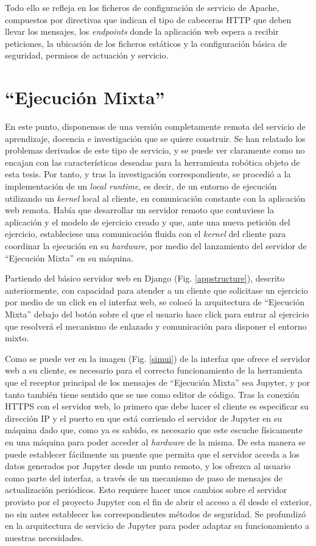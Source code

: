 Todo ello se refleja en los ficheros de configuración de servicio de Apache, compuestos por directivas que indican el tipo de cabeceras HTTP que deben llevar los mensajes, los \textit{endpoints} donde la aplicación web espera a recibir peticiones, la ubicación de los ficheros estáticos y la configuración básica de seguridad, permisos de actuación y servicio.

\section{``Ejecución Mixta''}

En este punto, disponemos de una versión completamente remota del servicio de aprendizaje, docencia e investigación que se quiere construir. Se han relatado los problemas derivados de este tipo de servicio, y se puede ver claramente como no encajan con las características deseadas para la herramienta robótica objeto de esta tesis. Por tanto, y tras la investigación correspondiente, se procedió a la implementación de un \textit{local runtime}, es decir, de un entorno de ejecución utilizando un \textit{kernel} local al cliente, en comunicación constante con la aplicación web remota. Había que desarrollar un servidor remoto que contuviese la aplicación y el modelo de ejercicio creado y que, ante una nueva petición del ejercicio, estableciese una comunicación fluida con el \textit{kernel} del cliente para coordinar la ejecución en su \textit{hardware}, por medio del lanzamiento del servidor de ``Ejecución Mixta'' en su máquina. 

Partiendo del básico servidor web en Django (Fig. \ref{appstructure}), descrito anteriormente, con capacidad para atender a un cliente que solicitase un ejercicio por medio de un click en el interfaz web, se colocó la arquitectura de ``Ejecución Mixta'' debajo del botón sobre el que el usuario hace click para entrar al ejercicio que resolverá el mecanismo de enlazado y comunicación para disponer el entorno mixto.

Como se puede ver en la imagen (Fig. \ref{simui}) de la interfaz que ofrece el servidor web a su cliente, es necesario para el correcto funcionamiento de la herramienta que el receptor principal de los mensajes de ``Ejecución Mixta'' sea Jupyter, y por tanto también tiene sentido que se use como editor de código. Tras la conexión HTTPS con el servidor web, lo primero que debe hacer el cliente es especificar su dirección IP y el puerto en que está corriendo el servidor de Jupyter en su máquina dado que, como ya es sabido, es necesario que este escuche físicamente en una máquina para poder acceder al \textit{hardware} de la misma. De esta manera se puede establecer fácilmente un puente que permita que el servidor acceda a los datos generados por Jupyter desde un punto remoto, y los ofrezca al usuario como parte del interfaz, a través de un mecanismo de paso de mensajes de actualización periódicos. Esto requiere hacer unos cambios sobre el servidor provisto por el proyecto Jupyter con el fin de abrir el acceso a él desde el exterior, no sin antes establecer los correspondientes métodos de seguridad. Se profundizó en la arquitectura de servicio de Jupyter para poder adaptar su funcionamiento a nuestras necesidades.

